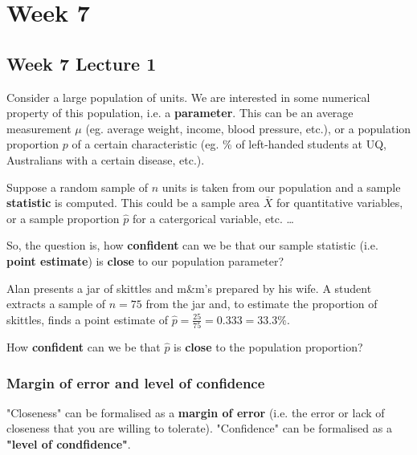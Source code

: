 \chapter{Week 7}

\section{Week 7 Lecture 1}\label{sec:w7lec1}

Consider a large population of units. We are interested in some numerical property of this population, i.e. a \textbf{parameter}. 
This can be an average measurement \(\mu\) (eg. average weight, income, blood pressure, etc.), or a population proportion \(p\) of a certain characteristic (eg. \% of left-handed students at UQ, Australians with a certain disease, etc.).

\bigskip

Suppose a random sample of \(n\) units is taken from our population and a sample \textbf{statistic} is computed. 
This could be a sample area \(\bar{X}\) for quantitative variables, or a sample proportion \(\hat{p}\) for a catergorical variable, etc. \dots

\bigskip

So, the question is, how \textbf{confident} can we be that our sample statistic (i.e. \textbf{point estimate}) is \textbf{close} to our population parameter?

\begin{example}\label{eg:skittlesandmnms}
    Alan presents a jar of skittles and m\&m's prepared by his wife. 
    A student extracts a sample of \(n=75\) from the jar and, to estimate the proportion of skittles, finds a point estimate of \(\hat{p} = \frac{25}{75} = 0.333 = 33.3\%\).
\end{example}

How \textbf{confident} can we be that \(\hat{p}\) is \textbf{close} to the population proportion?

\subsection{Margin of error and level of confidence} \label{subsec:MOE and lvl of conf}

"Closeness" can be formalised as a \textbf{margin of error} (i.e. the error or lack of closeness that you are willing to tolerate). 
"Confidence" can be formalised as a \textbf{"level of condfidence"}. 

\bigskip

